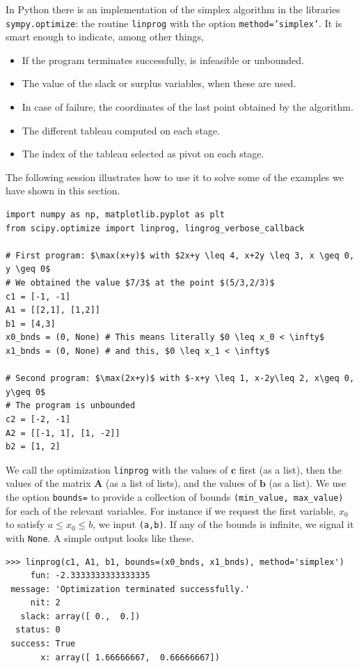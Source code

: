 \begin{example}
In Python there is an implementation of the simplex algorithm in the libraries \texttt{sympy.optimize}: the routine \texttt{linprog} with the option \texttt{method='simplex'}.  It is smart enough to indicate, among other things,
\begin{itemize}
	\item If the program terminates successfully, is infeasible or unbounded.
	\item The value of the slack or surplus variables, when these are used.
	\item In case of failure, the coordinates of the last point obtained by the algorithm.
	\item The different tableau computed on each stage.
	\item The index of the tableau selected as pivot on each stage.
\end{itemize} 
The following session illustrates how to use it to solve some of the examples we have shown in this section.

\begin{verbatim}
import numpy as np, matplotlib.pyplot as plt 
from scipy.optimize import linprog, lingrog_verbose_callback

# First program: $\max(x+y)$ with $2x+y \leq 4, x+2y \leq 3, x \geq 0, y \geq 0$
# We obtained the value $7/3$ at the point $(5/3,2/3)$
c1 = [-1, -1]
A1 = [[2,1], [1,2]]
b1 = [4,3]
x0_bnds = (0, None) # This means literally $0 \leq x_0 < \infty$
x1_bnds = (0, None) # and this, $0 \leq x_1 < \infty$

# Second program: $\max(2x+y)$ with $-x+y \leq 1, x-2y\leq 2, x\geq 0, y\geq 0$
# The program is unbounded
c2 = [-2, -1]
A2 = [[-1, 1], [1, -2]]
b2 = [1, 2]
\end{verbatim}

We call the optimization \texttt{linprog} with the values of $\boldsymbol{c}$ first (as a list), then the values of the matrix $\boldsymbol{A}$ (as a list of lists), and the values of $\boldsymbol{b}$ (as a list).  We use the option \texttt{bounds=} to provide a collection of bounds \texttt{(min\_value, max\_value)} for each of the relevant variables.  For instance if we request the first variable, $x_0$ to satisfy $a \leq x_0 \leq b$, we input \texttt{(a,b)}.  If any of the bounds is infinite, we signal it with \texttt{None}.  A simple output looks like these.

\begin{verbatim}
>>> linprog(c1, A1, b1, bounds=(x0_bnds, x1_bnds), method='simplex')
     fun: -2.3333333333333335
 message: 'Optimization terminated successfully.'
     nit: 2
   slack: array([ 0.,  0.])
  status: 0
 success: True
       x: array([ 1.66666667,  0.66666667])


\end{verbatim}
\end{example}
